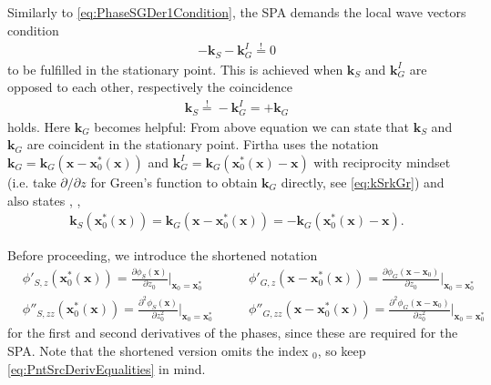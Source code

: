 \documentclass[a4paper,BCOR=15mm,10pt,twoside]{scrartcl}
\renewcommand{\vec}[1]{\mathbf{#1}}  %
\begin{document}
Similarly to \eqref{eq:PhaseSGDer1Condition}, the SPA demands the local wave vectors condition 
\begin{align}
-\vec{k}_S - \vec{k}_G^I \stackrel{!}{=} 0
\end{align}
to be fulfilled in the stationary point.
This is achieved when $\vec{k}_S $ and $\vec{k}_G^I$ are opposed to each other, respectively the coincidence
\begin{align}
\vec{k}_S \stackrel{!}{=} - \vec{k}_G^I = + \vec{k}_G
\end{align}
holds.
Here $\vec{k}_G$ becomes helpful:
From above equation we can state that $\vec{k}_S $ and $\vec{k}_G$ are coincident in the stationary point. Firtha uses the notation $\vec{k}_G = \vec{k}_G(\vec{x}-\vec{x}_0^*(\vec{x}))$ and $\vec{k}^I_G=\vec{k}_G(\vec{x}_0^*(\vec{x})-\vec{x})$ with reciprocity mindset (i.e. take $\partial / \partial z$ for Green's function to obtain $\vec{k}_G$ directly, see \eqref{eq:kSrkGr}) and also states \cite[(7)]{Firtha2018}, \cite[(3.34)]{Firtha2018Diss}, \cite[Fig. 3.7]{Firtha2018Diss}
\begin{align}
\label{eq:SPA_condition_z}
\vec{k}_S(\vec{x}_0^*(\vec{x})) = \vec{k}_G(\vec{x}-\vec{x}_0^*(\vec{x})) = -\vec{k}_G(\vec{x}_0^*(\vec{x})-\vec{x}).
\end{align}


Before proceeding, we introduce the shortened notation 
%
\begin{align}
&\phi'_{S,z}(\vec{x}_0^*(\vec{x})) = \frac{\partial \phi_{S}(\vec{x})}{\partial z_0}\bigg|_{\vec{x}_0=\vec{x}_0^*}\qquad
&\phi'_{G,z}(\vec{x}-\vec{x}_0^*(\vec{x})) = \frac{\partial \phi_{G}(\vec{x}-\vec{x}_0)}{\partial z_0}\bigg|_{\vec{x}_0=\vec{x}_0^*} \\
&\phi''_{S,zz}(\vec{x}_0^*(\vec{x})) = \frac{\partial^2 \phi_{S}(\vec{x})}{\partial z_0^2}\bigg|_{\vec{x}_0=\vec{x}_0^*}\qquad
&\phi''_{G,zz}(\vec{x}-\vec{x}_0^*(\vec{x})) = \frac{\partial^2 \phi_{G}(\vec{x}-\vec{x}_0)}{\partial z_0^2}\bigg|_{\vec{x}_0=\vec{x}_0^*}
\end{align}
for the first and second derivatives of the phases, since these are required for the SPA.
Note that the shortened version omits the index $_0$, so keep \eqref{eq:PntSrcDerivEqualities} in mind.
\end{document}
